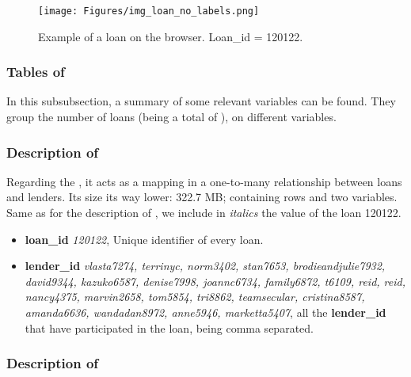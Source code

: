 \begin{figure}
\centering
\texttt{[image: Figures/img\_loan\_no\_labels.png]}
\decoRule
\caption[Example of a Kiva loan on the browser.]{Example of a loan on the browser. Loan\_id = 120122.}
\label{fig:LoanBrowser}
\end{figure}

\newpage
\subsubsection{Tables of }
In this subsubsection, a summary of some relevant variables can be found. They group the number of loans (being a total of ), on different variables.




\subsubsection{Description of }
Regarding the , it acts as a mapping in a one-to-many relationship between loans and lenders. Its size its way lower: 322.7 MB; containing  rows and two variables. Same as for the description of , we include in \textit{italics} the value of the loan 120122.
\begin{itemize}
\item \textbf{loan\_id} \textit{120122}, Unique identifier of every loan.
\item \textbf{lender\_id} \textit{vlasta7274, terrinyc, norm3402, stan7653, brodieandjulie7932, david9344, kazuko6587, denise7998, joannc6734, family6872, t6109, reid, reid, nancy4375, marvin2658, tom5854, tri8862, teamsecular, cristina8587, amanda6636, wandadan8972, anne5946, marketta5407}, all the \textbf{lender\_id} that have participated in the loan, being comma separated.
\end{itemize}
% 

\subsubsection{Description of }

